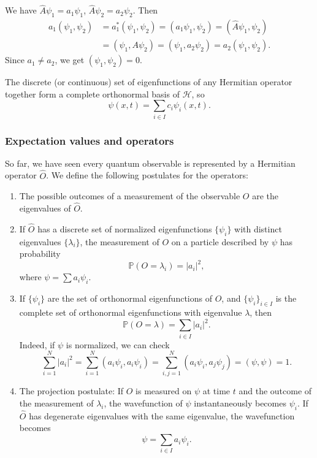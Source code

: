 \documentclass[12pt]{article}
\begin{document}
\begin{proofbox}	
We have $\hat A \psi_1 = a_1\psi_1$, $\hat A \psi_2 = a_2 \psi_2$. Then
\begin{align*}
	a_1(\psi_1, \psi_2) &= a_1^{\ast}(\psi_1, \psi_2) = (a_1 \psi_1, \psi_2) = (\hat A\psi_1, \psi_2) \\
			    &= (\psi_1, A \psi_2) = (\psi_1, a_2 \psi_2) = a_2(\psi_1, \psi_2).
\end{align*}
Since $a_1 \neq a_2$, we get $(\psi_1, \psi_2) = 0$.
\end{proofbox}


\begin{theorem}
	The discrete (or continuous) set of eigenfunctions of any Hermitian operator together form a complete orthonormal basis of $\mathcal{H}$, so
	\[
		\psi(x, t) = \sum_{i \in I}c_i \psi_i(x, t)
	.\]
\end{theorem}

\subsubsection{Expectation values and operators}%
\label{subsub:expectation_values_and_operators}

So far, we have seen every quantum observable is represented by a Hermitian operator $\hat O$. We define the following postulates for the operators:

\begin{enumerate}[1.]
	\item The possible outcomes of a measurement of the observable $O$ are the eigenvalues of $\hat O$.
	\item If $\hat O$ has a discrete set of normalized eigenfunctions $\{\psi_i\}$ with distinct eigenvalues $\{\lambda_i\}$, the measurement of $O$ on a particle described by $\psi$ has probability
		\[
			\mathbb{P}(O = \lambda_i) = |a_i|^2
		,\]
		where $\psi = \sum a_i \psi_i$.
	\item If $\{\psi_i\}$ are the set of orthonormal eigenfunctions of $\hat O$, and $\{\psi_i\}_{i \in I}$ is the complete set of orthonormal eigenfunctions with eigenvalue $\lambda$, then
		\[
			\mathbb{P}(O = \lambda) = \sum_{i \in I}|a_i|^2
		.\]
		Indeed, if $\psi$ is normalized, we can check
		\[
			\sum_{i = 1}^{N} |a_i|^2 = \sum_{i = 1}^{N}(a_i \psi_i, a_i \psi_i) = \sum_{i, j = 1}^{N} (a_i \psi_i, a_j \psi_j) = (\psi, \psi) = 1
		.\]
	\item The projection postulate: If $O$ is measured on $\psi$ at time $t$ and the outcome of the measurement of $\lambda_i$, the wavefunction of $\psi$ instantaneously becomes $\psi_i$. If $\hat O$ has degenerate eigenvalues with the same eigenvalue, the wavefunction becomes
		\[
		\psi = \sum_{i \in I}a_i \psi_i
		.\]
\end{enumerate}
\end{document}
